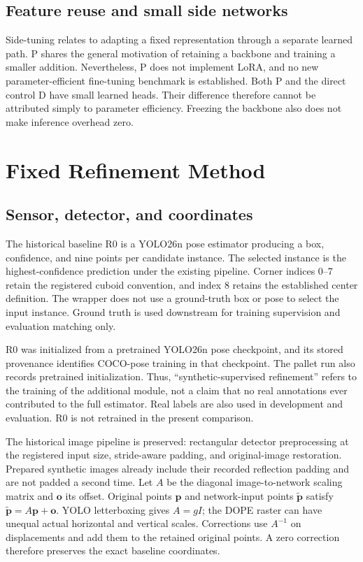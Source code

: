 \documentclass[journal]{IEEEtran}
\begin{document}
\subsection{Feature reuse and small side networks}
Side-tuning\cite{side} relates to adapting a fixed representation through a separate learned path. P shares the general motivation of retaining a backbone and training a smaller addition. Nevertheless, P does not implement LoRA, and no new parameter-efficient fine-tuning benchmark is established. Both P and the direct control D have small learned heads. Their difference therefore cannot be attributed simply to parameter efficiency. Freezing the backbone also does not make inference overhead zero.

\section{Fixed Refinement Method}
\subsection{Sensor, detector, and coordinates}
The historical baseline R0 is a YOLO26n pose estimator producing a box, confidence, and nine points per candidate instance. The selected instance is the highest-confidence prediction under the existing pipeline. Corner indices 0--7 retain the registered cuboid convention, and index 8 retains the established center definition. The wrapper does not use a ground-truth box or pose to select the input instance. Ground truth is used downstream for training supervision and evaluation matching only.

R0 was initialized from a pretrained YOLO26n pose checkpoint, and its stored provenance identifies COCO-pose training in that checkpoint. The pallet run also records pretrained initialization. Thus, ``synthetic-supervised refinement'' refers to the training of the additional module, not a claim that no real annotations ever contributed to the full estimator. Real labels are also used in development and evaluation. R0 is not retrained in the present comparison.

The historical image pipeline is preserved: rectangular detector preprocessing at the registered input size, stride-aware padding, and original-image restoration. Prepared synthetic images already include their recorded reflection padding and are not padded a second time. Let $A$ be the diagonal image-to-network scaling matrix and $\mathbf{o}$ its offset. Original points $\mathbf{p}$ and network-input points $\tilde{\mathbf{p}}$ satisfy $\tilde{\mathbf{p}}=A\mathbf{p}+\mathbf{o}$. YOLO letterboxing gives $A=gI$; the DOPE raster can have unequal actual horizontal and vertical scales. Corrections use $A^{-1}$ on displacements and add them to the retained original points. A zero correction therefore preserves the exact baseline coordinates.
\end{document}
